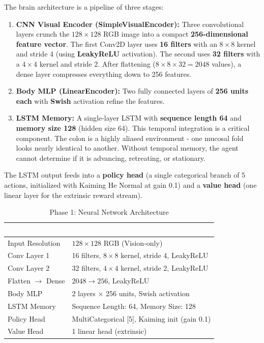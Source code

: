 The brain architecture is a pipeline of three stages:
\begin{enumerate}
\item \textbf{CNN Visual Encoder (SimpleVisualEncoder):} Three convolutional layers crunch the $128 \times 128$ RGB image into a compact \textbf{256-dimensional feature vector}. The first Conv2D layer uses \textbf{16 filters} with an $8 \times 8$ kernel and stride 4 (using \textbf{LeakyReLU} activation). The second uses \textbf{32 filters} with a $4 \times 4$ kernel and stride 2. After flattening ($8 \times 8 \times 32 = 2048$ values), a dense layer compresses everything down to 256 features.
\item \textbf{Body MLP (LinearEncoder):} Two fully connected layers of \textbf{256 units each} with \textbf{Swish} activation refine the features.
\item \textbf{LSTM Memory:} A single-layer LSTM with \textbf{sequence length 64} and \textbf{memory size 128} (hidden size 64). This temporal integration is a critical component. The colon is a highly aliased environment - one mucosal fold looks nearly identical to another. Without temporal memory, the agent cannot determine if it is advancing, retreating, or stationary.
\end{enumerate}

The LSTM output feeds into a \textbf{policy head} (a single categorical branch of 5 actions, initialized with Kaiming He Normal at gain 0.1) and a \textbf{value head} (one linear layer for the extrinsic reward stream).

\begin{table}[H]
\centering
\caption{Phase 1: Neural Network Architecture}
\label{tab:p1_network}
\begin{tabular}{|l|l|}
\rowcolor{primary}
\textcolor{white}{\textbf{Component}} & \textcolor{white}{\textbf{Specification}} \\
\hline
Input Resolution & $128 \times 128$ RGB (Vision-only) \\
\hline
Conv Layer 1 & 16 filters, $8 \times 8$ kernel, stride 4, LeakyReLU \\
\hline
Conv Layer 2 & 32 filters, $4 \times 4$ kernel, stride 2, LeakyReLU \\
\hline
Flatten $\rightarrow$ Dense & $2048 \rightarrow 256$, LeakyReLU \\
\hline
Body MLP & 2 layers $\times$ 256 units, Swish activation \\
\hline
LSTM Memory & Sequence Length: 64, Memory Size: 128 \\
\hline
Policy Head & MultiCategorical [5], Kaiming init (gain 0.1) \\
\hline
Value Head & 1 linear head (extrinsic) \\
\hline
\end{tabular}
\end{table}

